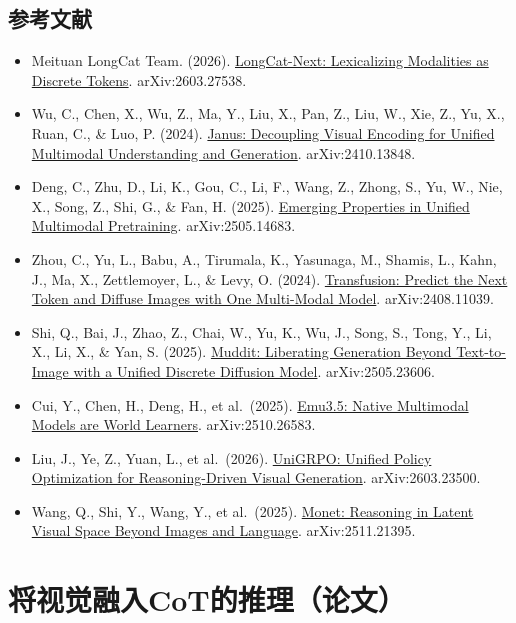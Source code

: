 \hypertarget{ux53c2ux8003ux6587ux732e-197}{%
\subsection{参考文献}\label{ux53c2ux8003ux6587ux732e-197}}

\begin{itemize}
\tightlist
\item
  Meituan LongCat Team. (2026). \href{https://arxiv.org/abs/2603.27538}{LongCat-Next: Lexicalizing Modalities as Discrete Tokens}. arXiv:2603.27538.
\item
  Wu, C., Chen, X., Wu, Z., Ma, Y., Liu, X., Pan, Z., Liu, W., Xie, Z., Yu, X., Ruan, C., \& Luo, P. (2024). \href{https://arxiv.org/abs/2410.13848}{Janus: Decoupling Visual Encoding for Unified Multimodal Understanding and Generation}. arXiv:2410.13848.
\item
  Deng, C., Zhu, D., Li, K., Gou, C., Li, F., Wang, Z., Zhong, S., Yu, W., Nie, X., Song, Z., Shi, G., \& Fan, H. (2025). \href{https://arxiv.org/abs/2505.14683}{Emerging Properties in Unified Multimodal Pretraining}. arXiv:2505.14683.
\item
  Zhou, C., Yu, L., Babu, A., Tirumala, K., Yasunaga, M., Shamis, L., Kahn, J., Ma, X., Zettlemoyer, L., \& Levy, O. (2024). \href{https://arxiv.org/abs/2408.11039}{Transfusion: Predict the Next Token and Diffuse Images with One Multi-Modal Model}. arXiv:2408.11039.
\item
  Shi, Q., Bai, J., Zhao, Z., Chai, W., Yu, K., Wu, J., Song, S., Tong, Y., Li, X., Li, X., \& Yan, S. (2025). \href{https://arxiv.org/abs/2505.23606}{Muddit: Liberating Generation Beyond Text-to-Image with a Unified Discrete Diffusion Model}. arXiv:2505.23606.
\item
  Cui, Y., Chen, H., Deng, H., et al.~(2025). \href{https://arxiv.org/abs/2510.26583}{Emu3.5: Native Multimodal Models are World Learners}. arXiv:2510.26583.
\item
  Liu, J., Ye, Z., Yuan, L., et al.~(2026). \href{https://arxiv.org/abs/2603.23500}{UniGRPO: Unified Policy Optimization for Reasoning-Driven Visual Generation}. arXiv:2603.23500.
\item
  Wang, Q., Shi, Y., Wang, Y., et al.~(2025). \href{https://arxiv.org/abs/2511.21395}{Monet: Reasoning in Latent Visual Space Beyond Images and Language}. arXiv:2511.21395.
\end{itemize}

\clearpage

\hypertarget{ux5c06ux89c6ux89c9ux878dux5165cotux7684ux63a8ux7406ux8bbaux6587}{%
\section{将视觉融入CoT的推理（论文）}\label{ux5c06ux89c6ux89c9ux878dux5165cotux7684ux63a8ux7406ux8bbaux6587}}

